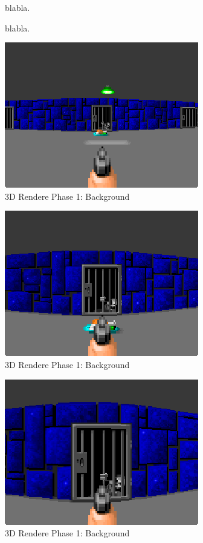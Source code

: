 \documentclass[book.tex]{subfiles}
\begin{document}
\begin{figure}[H]
\centering
 
 \caption{blabla.} \label{fig:Raycasting2}
\end{figure}

\begin{figure}[H]
\centering
 
 \caption{blabla.} \label{fig:Raycasting2}
\end{figure}

\begin{figure}[H]
\centering
 \includegraphics[scale=1.3]{imgs/fish_eye/bad_mild.png}
 \caption{3D Rendere Phase 1: Background} \label{fig:mips}
 \end{figure}
 
\begin{figure}[H]
\centering
 \includegraphics[scale=1.3]{imgs/fish_eye/bad_ok.png}
 \caption{3D Rendere Phase 1: Background} \label{fig:mips}
 \end{figure}
 
 \begin{figure}[H]
\centering
 \includegraphics[scale=1.3]{imgs/fish_eye/bad_bad.png}
 \caption{3D Rendere Phase 1: Background} \label{fig:mips}
 \end{figure}
\end{document}
